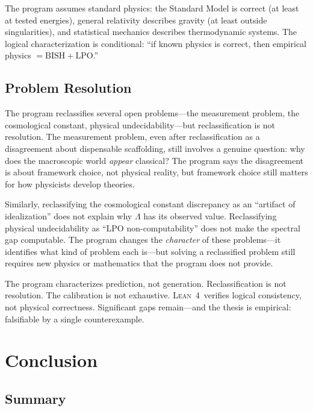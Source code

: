 \documentclass[11pt,a4paper]{report}
\theoremstyle{plain}
\theoremstyle{definition}
\theoremstyle{remark}
\newcommand{\BISH}{\mathrm{BISH}}
\newcommand{\LPO}{\mathrm{LPO}}
\newcommand{\Lean}{\textsc{Lean~4}}
\begin{document}
The program assumes standard physics: the Standard Model is correct (at least at tested energies), general relativity describes gravity (at least outside singularities), and statistical mechanics describes thermodynamic systems. The logical characterization is conditional: ``if known physics is correct, then empirical physics $= \BISH+\LPO$.''

\section{Problem Resolution}

The program reclassifies several open problems---the measurement problem, the cosmological constant, physical undecidability---but reclassification is not resolution. The measurement problem, even after reclassification as a disagreement about dispensable scaffolding, still involves a genuine question: why does the macroscopic world \emph{appear} classical? The program says the disagreement is about framework choice, not physical reality, but framework choice still matters for how physicists develop theories.

Similarly, reclassifying the cosmological constant discrepancy as an ``artifact of idealization'' does not explain why $\Lambda$ has its observed value. Reclassifying physical undecidability as ``$\LPO$ non-computability'' does not make the spectral gap computable. The program changes the \emph{character} of these problems---it identifies what kind of problem each is---but solving a reclassified problem still requires new physics or mathematics that the program does not provide.

\begin{chapterbox}
The program characterizes prediction, not generation. Reclassification is not resolution. The calibration is not exhaustive. \Lean\ verifies logical consistency, not physical correctness. Significant gaps remain---and the thesis is empirical: falsifiable by a single counterexample.
\end{chapterbox}

\chapter{Conclusion}

\section{Summary}
\end{document}
